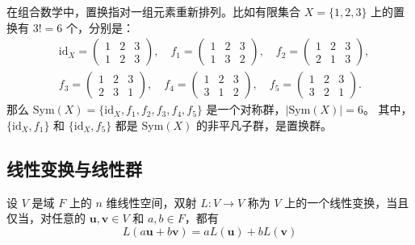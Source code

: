 \begin{note}
    在组合数学中，置换指对一组元素重新排列。比如有限集合 $X=\{1,2,3\}$ 上的置换有 $3! = 6$ 个，分别是：
    \[
        \begin{aligned}
            &\mathrm{id}_X = \begin{pmatrix}1 & 2 & 3 \\ 1 & 2 & 3\end{pmatrix},\quad
            f_1 = \begin{pmatrix}1 & 2 & 3 \\ 1 & 3 & 2\end{pmatrix},\quad
            f_2 = \begin{pmatrix}1 & 2 & 3 \\ 2 & 1 & 3\end{pmatrix},\\
            &f_3 = \begin{pmatrix}1 & 2 & 3 \\ 2 & 3 & 1\end{pmatrix},\quad
            f_4 = \begin{pmatrix}1 & 2 & 3 \\ 3 & 1 & 2\end{pmatrix},\quad
            f_5 = \begin{pmatrix}1 & 2 & 3 \\ 3 & 2 & 1\end{pmatrix}.
        \end{aligned}
    \]
    那么 $\mathrm{Sym}(X) = \{\mathrm{id}_X, f_1, f_2, f_3, f_4, f_5\}$ 是一个对称群，$| \mathrm{Sym}(X) | = 6$。
    其中，$\{\mathrm{id}_X, f_1\}$ 和 $\{\mathrm{id}_X, f_5\}$ 都是 $\mathrm{Sym}(X)$ 的非平凡子群，是置换群。
\end{note}

\vspace{1em}
\subsection{线性变换与线性群}
\begin{definition}
    设 $V$ 是域 $F$ 上的 $n$ 维线性空间，双射 $L:V\to V$ 称为 $V$ 上的一个线性变换，当且仅当，对任意的 $\mathbf{u}, \mathbf{v}\in V$ 和 $a, b\in F$，都有
    \[
        L(a\mathbf{u} + b\mathbf{v}) = aL(\mathbf{u}) + bL(\mathbf{v})
    \]
\end{definition}

